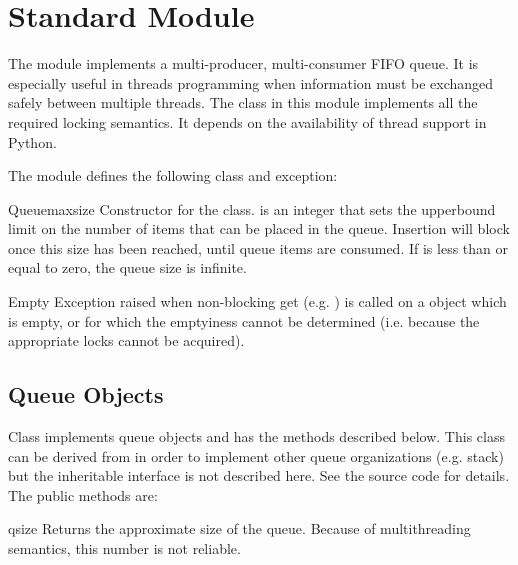 \section{Standard Module }




The  module implements a multi-producer, multi-consumer
FIFO queue.  It is especially useful in threads programming when
information must be exchanged safely between multiple threads.  The
 class in this module implements all the required locking
semantics.  It depends on the availability of thread support in
Python.

The  module defines the following class and exception:


\begin{classdesc}{Queue}{maxsize}
Constructor for the class.   is an integer that sets the
upperbound limit on the number of items that can be placed in the
queue.  Insertion will block once this size has been reached, until
queue items are consumed.  If  is less than or equal to
zero, the queue size is infinite.
\end{classdesc}

\begin{excdesc}{Empty}
Exception raised when non-blocking get (e.g. ) is
called on a  object which is empty, or for which the
emptyiness cannot be determined (i.e. because the appropriate locks
cannot be acquired).
\end{excdesc}

\subsection{Queue Objects}
\label{QueueObjects}

Class  implements queue objects and has the methods
described below.  This class can be derived from in order to implement
other queue organizations (e.g. stack) but the inheritable interface
is not described here.  See the source code for details.  The public
methods are:

\begin{methoddesc}{qsize}{}
Returns the approximate size of the queue.  Because of multithreading
semantics, this number is not reliable.
\end{methoddesc}

